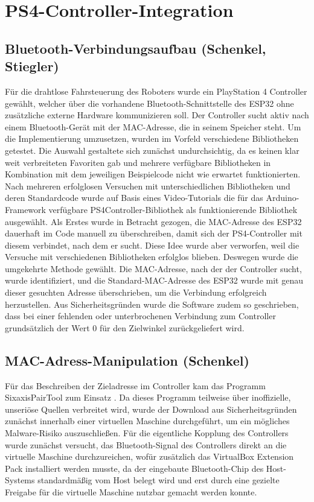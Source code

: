 \documentclass[fontsize=12pt,
parskip=half,	%
department=FakM,  %
logostyle=flat,
twoside, %
DIV=15,BCOR=10mm, %
]{OTHRreprt}
\begin{document}
\section{PS4-Controller-Integration}
\label{sec:ps4_integration}

\subsection{Bluetooth-Verbindungsaufbau (Schenkel, Stiegler)}
\label{subsec:ps4_bluetooth}

Für die drahtlose Fahrsteuerung des Roboters wurde ein PlayStation 4 Controller gewählt, welcher über die vorhandene Bluetooth-Schnittstelle des ESP32 ohne zusätzliche externe Hardware kommunizieren soll.
Der Controller sucht aktiv nach einem Bluetooth-Gerät mit der MAC-Adresse, die in seinem Speicher steht.
Um die Implementierung umzusetzen, wurden im Vorfeld verschiedene Bibliotheken getestet. Die Auswahl gestaltete sich zunächst undurchsichtig, da es keinen klar weit verbreiteten Favoriten gab und mehrere verfügbare Bibliotheken in Kombination mit dem jeweiligen Beispielcode nicht wie erwartet funktionierten. 
Nach mehreren erfolglosen Versuchen mit unterschiedlichen Bibliotheken und deren Standardcode wurde auf Basis eines Video-Tutorials die für das Arduino-Framework verfügbare PS4Controller-Bibliothek als funktionierende Bibliothek ausgewählt.
Als Erstes wurde in Betracht gezogen, die MAC-Adresse des ESP32 dauerhaft im Code manuell zu überschreiben, damit sich der PS4-Controller mit diesem verbindet, nach dem er sucht. Diese Idee wurde aber verworfen, weil die Versuche mit verschiedenen Bibliotheken erfolglos blieben. 
Deswegen wurde die umgekehrte Methode gewählt. Die MAC-Adresse, nach der der Controller sucht, wurde identifiziert, und die Standard-MAC-Adresse des ESP32 wurde mit genau dieser gesuchten Adresse überschrieben, um die Verbindung erfolgreich herzustellen.
Aus Sicherheitsgründen wurde die Software zudem so geschrieben, dass bei einer fehlenden oder unterbrochenen Verbindung zum Controller grundsätzlich der Wert 0 für den Zielwinkel zurückgeliefert wird.

\subsection{MAC-Adress-Manipulation (Schenkel)}
\label{subsec:mac_manipulation}
Für das Beschreiben der Zieladresse im Controller kam das Programm SixaxisPairTool zum Einsatz \cite{SixaxisPairTool}. Da dieses Programm teilweise über inoffizielle, unseriöse Quellen verbreitet wird, wurde der Download aus Sicherheitsgründen zunächst innerhalb einer virtuellen Maschine durchgeführt, um ein mögliches Malware-Risiko auszuschließen.
 Für die eigentliche Kopplung des Controllers wurde zunächst versucht, das Bluetooth-Signal des Controllers direkt an die virtuelle Maschine durchzureichen, wofür zusätzlich das VirtualBox Extension Pack installiert werden musste, da der eingebaute Bluetooth-Chip des Host-Systems standardmäßig vom Host belegt wird und erst durch eine gezielte Freigabe für die virtuelle Maschine nutzbar gemacht werden konnte.
\end{document}
